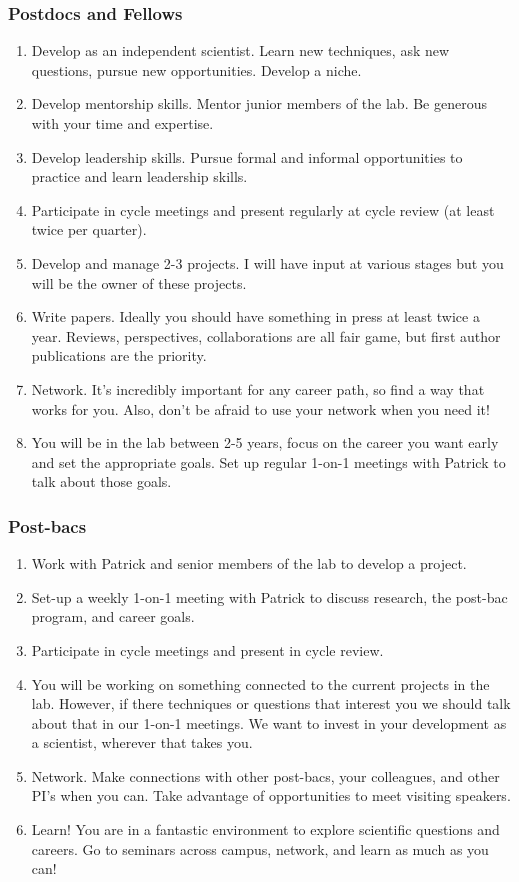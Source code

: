 \documentclass[10pt, a4paper, twocolumn]{article} %
\begin{document}
\subsubsection{Postdocs and Fellows}
\begin{enumerate}
\item Develop as an independent scientist. Learn new techniques, ask new questions, pursue new opportunities. Develop a niche.
\item Develop mentorship skills. Mentor junior members of the lab. Be generous with your time and expertise.
\item Develop leadership skills. Pursue formal and informal opportunities to practice and learn leadership skills.
\item Participate in cycle meetings and present regularly at cycle review (at least twice per quarter).
\item Develop and manage 2-3 projects. I will have input at various stages but you will be the owner of these projects.
\item Write papers. Ideally you should have something in press at least twice a year. Reviews, perspectives, collaborations are all fair game, but first author publications are the priority.
\item Network. It's incredibly important for any career path, so find a way that works for you. Also, don't be afraid to use your network when you need it!
\item You will be in the lab between 2-5 years, focus on the career you want early and set the appropriate goals. Set up regular 1-on-1 meetings with Patrick to talk about those goals.
\end{enumerate}
\subsubsection{Post-bacs}
\begin{enumerate}
\item Work with Patrick and senior members of the lab to develop a project.
\item Set-up a weekly 1-on-1 meeting with Patrick to discuss research, the post-bac program, and career goals.
\item Participate in cycle meetings and present in cycle review.
\item You will be working on something connected to the current projects in the lab. However, if there techniques or questions that interest you we should talk about that in our 1-on-1 meetings. We want to invest in your development as a scientist, wherever that takes you.
\item Network. Make connections with other post-bacs, your colleagues, and other PI's when you can. Take advantage of opportunities to meet visiting speakers.
\item Learn! You are in a fantastic environment to explore scientific questions and careers. Go to seminars across campus, network, and learn as much as you can!
\end{enumerate}
\end{document}
